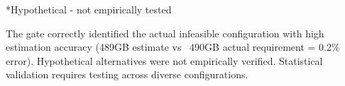*Hypothetical - not empirically tested

The gate correctly identified the actual infeasible configuration with high estimation accuracy (489GB estimate vs ~490GB actual requirement = 0.2\% error). Hypothetical alternatives were not empirically verified. Statistical validation requires testing across diverse configurations.

